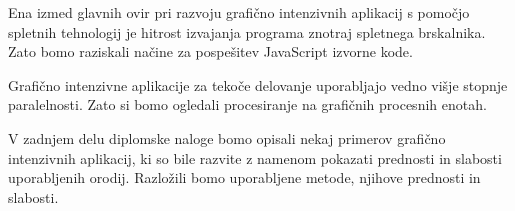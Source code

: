 Ena izmed glavnih ovir pri razvoju grafično intenzivnih aplikacij s pomočjo spletnih tehnologij je hitrost izvajanja programa znotraj spletnega brskalnika. Zato bomo raziskali načine za pospešitev JavaScript izvorne kode.

Grafično intenzivne aplikacije za tekoče delovanje uporabljajo vedno višje stopnje paralelnosti. Zato si bomo ogledali procesiranje na grafičnih procesnih enotah.

V zadnjem delu diplomske naloge bomo opisali nekaj primerov grafično intenzivnih aplikacij, ki so bile razvite z namenom pokazati prednosti in slabosti uporabljenih orodij. Razložili bomo uporabljene metode, njihove prednosti in slabosti.
